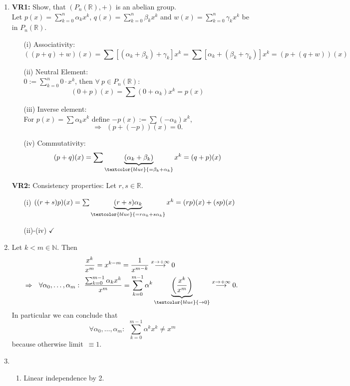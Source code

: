 {\color{solution}
\begin{enumerate}
	\item 
	\textbf{VR1:} Show, that $(P_n(\mathbb{R}), +)$ is an abelian group.\\
	Let $p(x) =\sum_{k=0}^{n}\alpha_kx^k$, $q(x)=\sum_{k=0}^{n}\beta_kx^k$ and $w(x)=\sum_{k=0}^{n}\gamma_kx^k$ be in $P_n(\mathbb{R})$.
	\begin{itemize}
		\item [(i)] Associativity:$$((p+q)+w)(x)=\sum [(\alpha_k+\beta_k)+\gamma_k]x^k=\sum[\alpha_k+(\beta_k+\gamma_k)]x^k=(p+(q+w))(x)$$
		\item [(ii)] Neutral Element:\\$0:=\sum_{k=0}^{n}0\cdot x^k$, then $\forall~p\in P_n(\mathbb{R})$:$$(0+p)(x)=\sum (0+\alpha_k)x^k=p(x)$$
		\item [(iii)] Inverse element:\\For $p(x)=\sum \alpha_kx^k$ define $-p(x):=\sum (-\alpha_k)x^k$,$$\Rightarrow~~(p+(-p))(x)=0.$$
		\item [(iv)] Commutativity:$$(p+q)(x)=\sum\underbrace{(\alpha_k+\beta_k)}_{\textcolor{blue}{=\beta_k+\alpha_k}}x^k=(q+p)(x)$$
	\end{itemize}
	\textbf{VR2:} Consistency properties: Let $r,s\in\mathbb{R}$.
	\begin{itemize}
		\item [(i)] $((r+s)p)(x)=\sum\underbrace{(r+s)\alpha_k}_{\textcolor{blue}{=r\alpha_k+s\alpha_k}}x^k=(rp)(x)+(sp)(x)$
		\item[] (ii)-(iv)
		$\checkmark$
	\end{itemize}
	\item 
	Let $k<m\in\mathbb{N}$. Then
	\begin{align*}
	&\frac{x^k}{x^m}=x^{k-m}=\frac{1}{x^{m-k}}\stackrel{x\rightarrow +\infty}{\longrightarrow} 0\\
	\Rightarrow~~\forall \alpha_0,\dots,\alpha_m:~~&\frac{\sum_{k=0}^{m-1}\alpha_kx^k}{x^m}=\sum_{k=0}^{m-1}\alpha^k\underbrace{\left(\frac{x^k}{x^m}\right)}_{\textcolor{blue}{\rightarrow 0}}\stackrel{x\rightarrow +\infty}{\longrightarrow} 0.
	\end{align*}
	In particular we can conclude that
	$$
	~~\forall\alpha_0,\dots,\alpha_m:~~\sum_{k=0}^{m-1}\alpha^kx^k\neq x^m~
	$$
	because otherwise limit~$\equiv 1$.
	\item 
	\begin{enumerate}
		\item 
		Linear independence by 2.\\

\end{enumerate}
\end{enumerate}}
